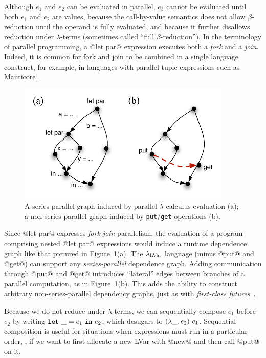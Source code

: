 Although $e_1$ and $e_2$ can be evaluated in parallel, $e_3$ cannot be
evaluated until both $e_1$ and $e_2$ are values, because the
call-by-value semantics does not allow $\beta$-reduction until the
operand is fully evaluated, and because it further disallows reduction
under $\lambda$-terms (sometimes called ``full $\beta$-reduction'').
In the terminology of parallel programming, a @let par@ expression
executes both a \emph{fork} and a \emph{join}.  Indeed, it is common
for fork and join to be combined in a single language construct, for
example, in languages with parallel tuple expressions such as
Manticore~\cite{manticore_parallel_tuples}.

\begin{figure}[tb]
  \centering 
\includegraphics[width=4in]{chapter2/figures/lvars-series-parallel.pdf} 
\caption{A series-parallel graph induced by parallel
  $\lambda$-calculus evaluation (a); a non-series-parallel graph
  induced by \lstinline|put|/\lstinline|get| operations (b).}
  \label{f:lvars-series-parallel}
\end{figure}

Since @let par@ expresses \emph{fork-join} parallelism, the evaluation
of a program comprising nested @let par@ expressions would induce a
runtime dependence graph like that pictured in
Figure~\ref{f:lvars-series-parallel}(a).  The $\lambda_{\textrm{LVar}}$ language
(minus @put@ and @get@) can support any \emph{series-parallel}
dependence graph.  Adding communication through @put@ and @get@
introduces ``lateral'' edges between branches of a parallel
computation, as in Figure~\ref{f:lvars-series-parallel}(b).  This adds
the ability to construct arbitrary non-series-parallel dependency
graphs, just as with \emph{first-class
  futures}~\cite{beyond-nested-workstealing}.

Because we do not reduce under $\lambda$-terms, we can sequentially
compose $e_1$ before $e_2$ by writing $\mbox{\texttt{let}}~\_=e_1~\mbox{\texttt{in}}~e_2$, which
desugars to $(\lambda\_.\,e_2)~e_1$.  Sequential composition is
useful for situations when expressions must run in a particular order,
\eg, if we want to first allocate a new LVar with @new@ and then call
@put@ on it.

